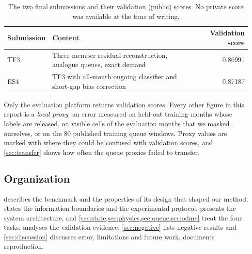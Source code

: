 \begin{table}[h]
\centering\small
\caption{The two final submissions and their validation (public) scores. No private score was available at the time
of writing.}\label{tab:selected}
\begin{tabular}{@{}l l r@{}}
\toprule
Submission & Content & Validation score \\
\midrule
TF3 & Three-member residual reconstruction, analogue queues, exact demand & 0.86991 \\
ES4 & TF3 with all-month ongoing classifier and short-gap bias correction & 0.87187 \\
\bottomrule
\end{tabular}
\end{table}

Only the evaluation platform returns validation scores. Every other figure in this report is a \emph{local proxy}: an
error measured on held-out training months whose labels are released, on visible cells of the evaluation months that
we masked ourselves, or on the 80 published training queue windows. Proxy values are marked with \proxy{} where they
could be confused with validation scores, and \cref{sec:transfer} shows how often the queue proxies failed to transfer.

\subsection{Organization}
 describes the benchmark and the properties of its design that shaped our method.
 states the information boundaries and the experimental protocol. 
presents the system architecture, and \cref{sec:state,sec:physics,sec:queue,sec:odme} treat the four tasks.
 analyses the validation evidence, \cref{sec:negative} lists negative results and
\cref{sec:discussion} discusses error, limitations and future work.  documents reproduction.
